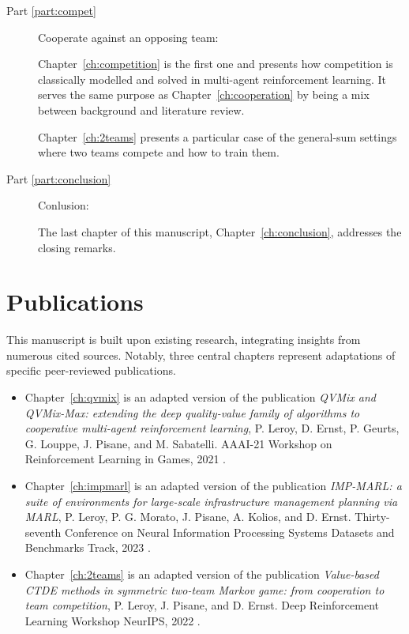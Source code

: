 \begin{description}
    \item [Part \ref{part:compet}]  Cooperate against an opposing team:
    
    Chapter~\ref{ch:competition} is the first one and presents how competition is classically modelled and solved in multi-agent reinforcement learning.
    It serves the same purpose as Chapter~\ref{ch:cooperation} by being a mix between background and literature review.
    
    Chapter~\ref{ch:2teams} presents a particular case of the general-sum settings where two teams compete and how to train them.

    \item [Part \ref{part:conclusion}] Conlusion:
    
    The last chapter of this manuscript, Chapter~\ref{ch:conclusion}, addresses the closing remarks.
\end{description}

\section{Publications}
\label{sec:ch1_publications}

This manuscript is built upon existing research, integrating insights from numerous cited sources.
Notably, three central chapters represent adaptations of specific peer-reviewed publications.

\begin{itemize}
\item Chapter~\ref{ch:qvmix} is an adapted version of the publication \textit{QVMix and QVMix-Max: extending the deep quality-value family of algorithms to cooperative multi-agent reinforcement learning}, P. Leroy, D. Ernst, P. Geurts, G. Louppe, J. Pisane, and M. Sabatelli. AAAI-21 Workshop on Reinforcement Learning in Games, 2021 \citep{leroy2020qvmix}.

\item Chapter~\ref{ch:impmarl} is an adapted version of the publication \textit{IMP-MARL: a suite of environments for large-scale infrastructure management planning via MARL}, P. Leroy, P. G. Morato, J. Pisane, A. Kolios, and D. Ernst. Thirty-seventh Conference on Neural Information Processing Systems Datasets and Benchmarks Track, 2023 \citep{leroy2023impmarl}.

\item Chapter~\ref{ch:2teams} is an adapted version of the publication \textit{Value-based CTDE methods in symmetric two-team Markov game: from cooperation to team competition}, P. Leroy, J. Pisane, and D. Ernst. Deep Reinforcement Learning Workshop NeurIPS, 2022 \citep{leroy2022twoteam}.
\end{itemize}


